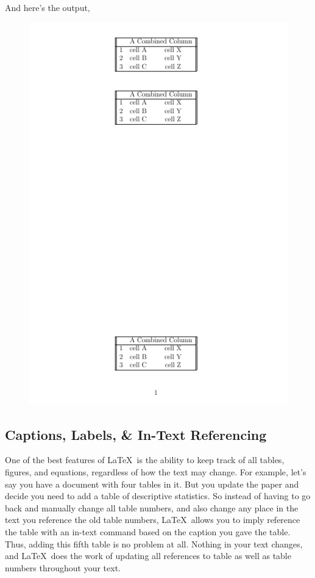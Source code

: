 \documentclass[11pt]{article}
\newcommand{\forceindent}{\leavevmode{\parindent=1.5em\indent}} %
\begin{document}
\newpage

And here's the output,

\begin{figure}[!h]
	\includegraphics[scale=.6]{OUT6} \\ %
	\centering
\end{figure}

\newpage

\subsection{Captions, Labels, \& In-Text Referencing}

\forceindent One of the best features of \LaTeX\ is the ability to keep track of all tables, figures, and equations, regardless of how the text may change. For example, let's say you have a document with four tables in it. But you update the paper and decide you need to add a table of descriptive statistics. So instead of having to go back and manually change all table numbers, and also change any place in the text you reference the old table numbers, \LaTeX\ allows you to imply reference the table with an in-text command based on the caption you gave the table. Thus, adding this fifth table is no problem at all. Nothing in your text changes, and \LaTeX\ does the work of updating all references to table as well as table numbers throughout your text. \\
\end{document}
